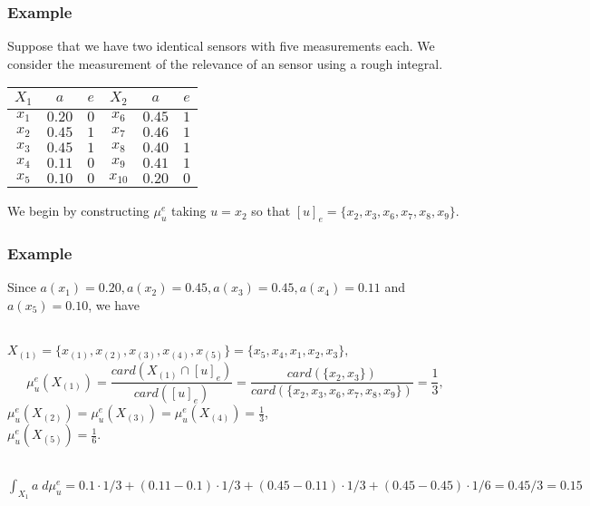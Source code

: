 \documentclass[envcountsect]{beamer}
\begin{document}
\begin{frame}
	\frametitle{Example}
Suppose that we have two identical sensors with five measurements each. We consider the measurement of the relevance of an sensor using a rough integral. 

\begin{table}
	\begin{tabular}{cccccc}
		\hline 
		$X_1$& $a$& $e$& $X_2$& $a$& $e$\\
		\hline
		$x_1$ & $0.20$ & $0$&  $x_6$ & $0.45$ & $1$ \\
		$x_2$ & $0.45$ & $1$ & $x_7$ & $0.46$ & $1$ \\
		$x_3$ & $0.45$ & $1$ & $x_8$ & $0.40$ & $1$  \\
		$x_4$ & $0.11$ & $0$ & $x_9$ & $0.41$ & $1$ \\
		$x_5$ & $0.10$ & $0$ & $x_{10}$ & $0.20$ & $0$\\
		\hline
	\end{tabular}
\end{table}
	We begin by constructing $\mu_u^e$ taking $u=x_2$ so that $[u]_e = \{x_2,x_3,x_6,x_7,x_8,x_9\}.$
\end{frame}

\begin{frame}
	\frametitle{Example}
	Since $a(x_1) = 0.20, a(x_2) = 0.45, a(x_3)=0.45, a(x_4) = 0.11$ and $a(x_5) = 0.10$, we have \\~

	$X_{(1)} = \{x_{(1)},x_{(2)},x_{(3)},x_{(4)},x_{(5)}\} = \{x_5,x_4,x_1,x_2,x_3\},$ 
	$$\mu_u^e(X_{(1)}) = \frac{card(X_{(1)}\cap[u]_e)}{card([u]_e)} = \frac{card(\{x_2,x_3\})}{card(\{x_2,x_3,x_6,x_7,x_8,x_9\})} = \frac{1}{3},$$
	$\mu_u^e(X_{(2)}) = \mu_u^e(X_{(3)}) = \mu_u^e(X_{(4)}) = \frac{1}{3}$, \\


	$\mu_u^e(X_{(5)}) = \frac{1}{6}.$\\~

	$\int_{X_1} a \;d\mu_u^e = 0.1\cdot1/3+(0.11-0.1) \cdot 1/3 + (0.45-0.11)\cdot 1/3 + (0.45-0.45)\cdot 1/6 = 0.45/3 = 0.15$



\end{frame}
\end{document}
